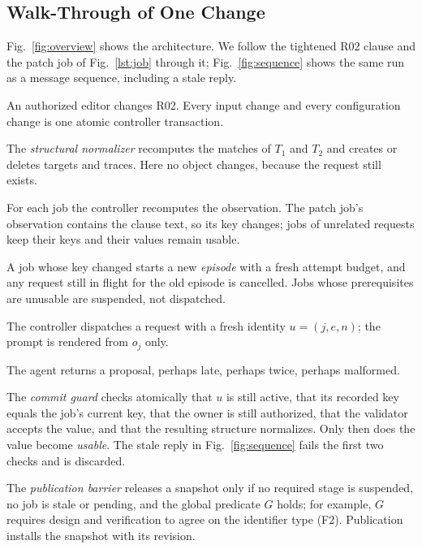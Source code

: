 \subsection{Walk-Through of One Change}\label{sec:walkthrough}
Fig.~\ref{fig:overview} shows the architecture. We follow the tightened R02 clause and the patch job of Fig.~\ref{lst:job} through it; Fig.~\ref{fig:sequence} shows the same run as a message sequence, including a stale reply.
\begin{steps}
\item[\step{1}] An authorized editor changes R02. Every input change and every configuration change is one atomic controller transaction.
\item[\step{2}] The \emph{structural normalizer} recomputes the matches of $T_1$ and $T_2$ and creates or deletes targets and traces. Here no object changes, because the request still exists.
\item[\step{3}] For each job the controller recomputes the observation. The patch job's observation contains the clause text, so its key changes; jobs of unrelated requests keep their keys and their values remain usable.
\item[\step{4}] A job whose key changed starts a new \emph{episode} with a fresh attempt budget, and any request still in flight for the old episode is cancelled. Jobs whose prerequisites are unusable are suspended, not dispatched.
\item[\step{5}] The controller dispatches a request with a fresh identity $u=(j,e,n)$; the prompt is rendered from $o_j$ only.
\item[\step{6}] The agent returns a proposal, perhaps late, perhaps twice, perhaps malformed.
\item[\step{7}] The \emph{commit guard} checks atomically that $u$ is still active, that its recorded key equals the job's current key, that the owner is still authorized, that the validator accepts the value, and that the resulting structure normalizes. Only then does the value become \emph{usable}. The stale reply in Fig.~\ref{fig:sequence} fails the first two checks and is discarded.
\item[\step{8}] The \emph{publication barrier} releases a snapshot only if no required stage is suspended, no job is stale or pending, and the global predicate $G$ holds; for example, $G$ requires design and verification to agree on the identifier type (F2). Publication  installs the snapshot with its revision.
\end{steps}

